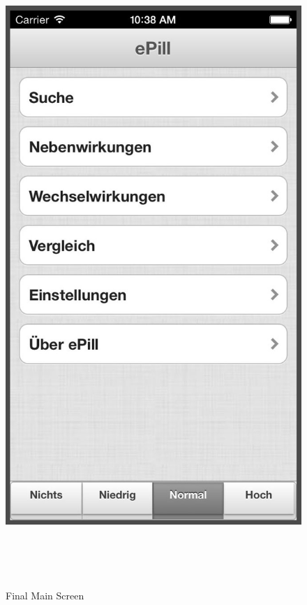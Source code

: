 \begin{figure}[ptbh]
\begin{minipage}[b]{0.45\linewidth}
        \includegraphics[width=0.8025\linewidth]{figures/Main_Screen_bw.jpg}
        \caption[Final Main Screen]{Final Main Screen}
        \label{fig:FinalMainScreen}
    \end{minipage}
    \\
    \\
    \\
    \begin{minipage}[b]{0.45\linewidth}
        \centering

\end{minipage}
\end{figure}
